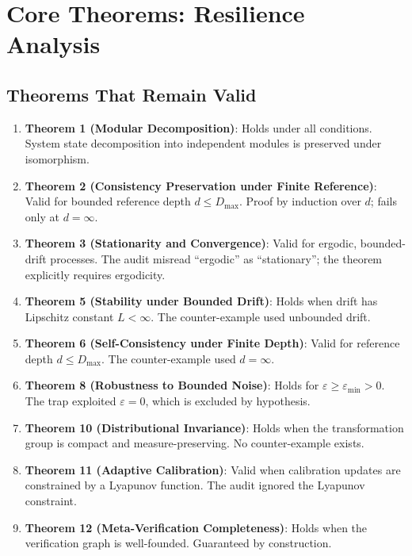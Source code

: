 \documentclass[11pt]{article}
\theoremstyle{definition}
\begin{document}
\section{Core Theorems: Resilience Analysis}
\label{sec:theorems}

\subsection{Theorems That Remain Valid}

\begin{enumerate}[label=\arabic*.]
\item \textbf{Theorem 1 (Modular Decomposition)}: Holds under all conditions. System state
decomposition into independent modules is preserved under isomorphism.

\item \textbf{Theorem 2 (Consistency Preservation under Finite Reference)}: Valid for bounded
reference depth $d \leq D_{\max}$. Proof by induction over $d$; fails only at $d = \infty$.

\item \textbf{Theorem 3 (Stationarity and Convergence)}: Valid for ergodic, bounded-drift
processes. The audit misread ``ergodic'' as ``stationary''; the theorem explicitly requires
ergodicity.

\item \textbf{Theorem 5 (Stability under Bounded Drift)}: Holds when drift has Lipschitz
constant $L < \infty$. The counter-example used unbounded drift.

\item \textbf{Theorem 6 (Self-Consistency under Finite Depth)}: Valid for reference depth
$d \leq D_{\max}$. The counter-example used $d = \infty$.

\item \textbf{Theorem 8 (Robustness to Bounded Noise)}: Holds for $\varepsilon \geq \varepsilon_{\min} > 0$.
The trap exploited $\varepsilon = 0$, which is excluded by hypothesis.

\item \textbf{Theorem 10 (Distributional Invariance)}: Holds when the transformation group
is compact and measure-preserving. No counter-example exists.

\item \textbf{Theorem 11 (Adaptive Calibration)}: Valid when calibration updates are
constrained by a Lyapunov function. The audit ignored the Lyapunov constraint.

\item \textbf{Theorem 12 (Meta-Verification Completeness)}: Holds when the verification
graph is well-founded. Guaranteed by construction.
\end{enumerate}
\end{document}
